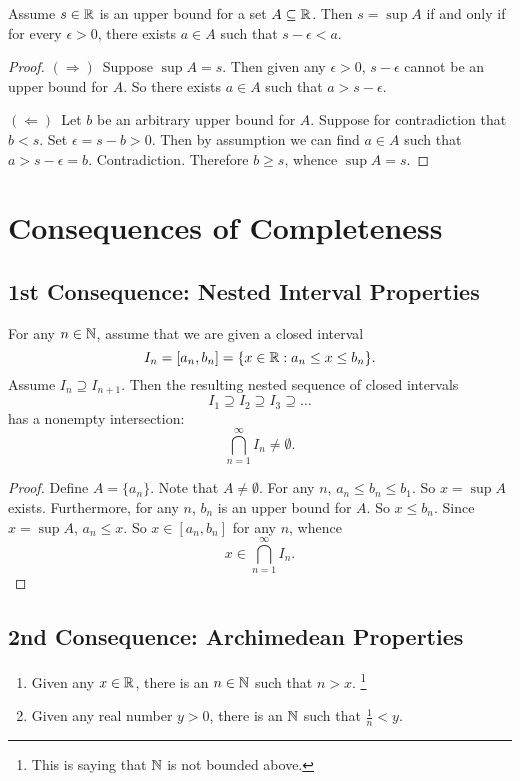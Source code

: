 \begin{lemma}
  Assume $s \in \mathbb{R}$ is an upper bound for a set
  $A \subseteq \mathbb{R}$. Then $s = \sup A$ if and only
  if for every $\epsilon > 0$, there exists
  $a \in A$ such that  $s - \epsilon < a$.
\end{lemma}

\begin{proof}
$(\Rightarrow)$\, Suppose $\sup A = s$. Then given any
$\epsilon > 0$,  $s - \epsilon$ cannot be an upper
bound for $A$. So there exists $a \in A$ such that
$a > s - \epsilon$.

$(\Leftarrow)$\, Let $b$ be an arbitrary upper bound
for $A$. Suppose for contradiction that $b < s$. Set
$\epsilon = s - b > 0$. Then by assumption we can
find $a \in A$ such that $a > s - \epsilon = b$.
Contradiction. Therefore $b \ge s$, whence $\sup A = s$.
\end{proof}

\section{Consequences of Completeness}
\subsection{1st Consequence: Nested Interval Properties}
\begin{theorem}
  For any $n \in \mathbb{N}$, assume that we are given a closed
  interval
  \[
    I_n = [a_n, b_n] = \{x \in \mathbb{R} : a_n \le x \le b_n\}
  .\]
  Assume $I_n \supseteq I_{n+1}$. Then the resulting
  nested sequence of closed intervals
  \[I_1 \supseteq I_2 \supseteq I_3 \supseteq \dots\]
  has a nonempty intersection:
  \[\bigcap_{n=1}^\infty I_n \ne \emptyset.\]
\end{theorem}

\begin{proof}
  Define $A = \{a_n\}$. Note that  $A \ne \emptyset$.
  For any $n$, $a_n \le b_n \le b_1$. So $x = \sup A$
  exists. Furthermore, for any $n$, $b_n$ is an upper
  bound for $A$. So  $x \le b_n$. Since  $x = \sup A$,
  $a_n \le x$. So $x \in [a_n, b_n]$ for any $n$,
  whence
  \[x \in \bigcap_{n = 1}^\infty I_n.\]
\end{proof}

\subsection{2nd Consequence: Archimedean Properties}
\begin{theorem}\leavevmode
  \begin{enumerate}
    \item Given any $x \in \mathbb{R}$, there is an $n \in \mathbb{N}$
      such that $n > x$.
    \footnote{This is saying that $\mathbb{N}$ is not bounded
      above.}
    \item Given any real number $y > 0$, there is an
      $\mathbb{N}$ such that  $\frac{1}{n} < y$.
  \end{enumerate}
\end{theorem}

